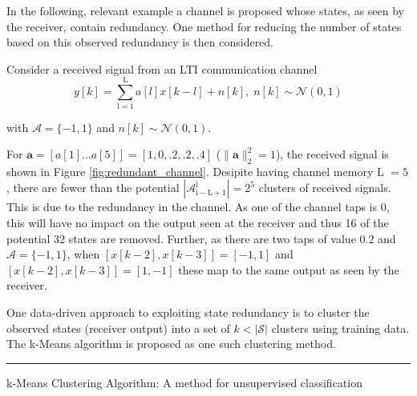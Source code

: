 In the following, relevant example a channel is proposed whose states, as seen by the receiver, contain redundancy. One method for reducing the number of states based on this observed redundancy is then considered. 

Consider a received signal from an LTI communication channel
\begin{equation*}
y[k] = \sum_{\mathrm{l=1}}^{\mathrm{L}} a[l]x[k-l] + n[k], \; n[k]  \sim \mathcal{N}(0,1)
\end{equation*}

with  $\mathcal{A}=\{-1, 1\}$ and $n[k]  \sim \mathcal{N}(0,1)$.  

For $\mathbf{a} = [a[1]...a[5]]=[1, 0, .2, .2, .4]$ ($\|\mathbf{a}\|^2_2 = 1$), the received signal is shown in Figure \ref{fig:redundant_channel}. Desipite having channel memory L $=5$, there are fewer than the potential $|\mathcal{A}_{\mathrm{i-L+1}}^{\mathrm{i}}| =2^5$ clusters of received signals. This is due to the redundancy in the channel.  As one of the channel taps is 0, this will have no impact on the output seen at the receiver and thus 16 of the potential 32 states are removed. Further, as there are two taps of value 0.2 and $\mathcal{A}=\{-1, 1\}$, when $\left[x[k-2],x[k-3]\right] = [-1,1]$ and $\left[x[k-2],x[k-3]\right] = [1,-1]$ these map to the same output as seen by the receiver. 


\par
One data-driven approach to exploiting state redundancy is to cluster the observed states (receiver output) into a set of $k<|\mathcal{S}|$ clusters using training data. The k-Means algorithm is proposed as one such clustering method.
\\

    \noindent\rule[16pt]{\textwidth}{0.6pt}
k-Means Clustering Algorithm: A method for unsupervised classification

